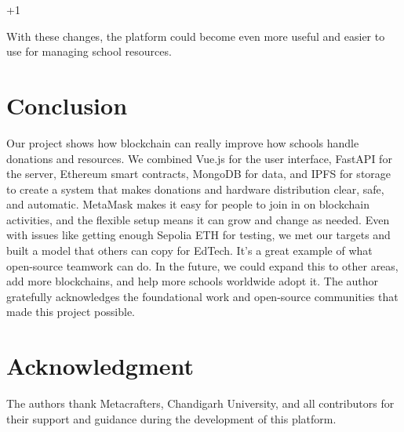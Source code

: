 +1\documentclass[conference]{IEEEtran}
\begin{document}
With these changes, the platform could become even more useful and easier to use for managing school resources.

\section{Conclusion}
Our project shows how blockchain can really improve how schools handle donations and resources. We combined Vue.js for the user interface, FastAPI for the server, Ethereum smart contracts, MongoDB for data, and IPFS for storage to create a system that makes donations and hardware distribution clear, safe, and automatic. MetaMask makes it easy for people to join in on blockchain activities, and the flexible setup means it can grow and change as needed. Even with issues like getting enough Sepolia ETH for testing, we met our targets and built a model that others can copy for EdTech. It's a great example of what open-source teamwork can do. In the future, we could expand this to other areas, add more blockchains, and help more schools worldwide adopt it. The author gratefully acknowledges the foundational work and open-source communities that made this project possible.

\section*{Acknowledgment}
The authors thank Metacrafters, Chandigarh University, and all contributors for their support and guidance during the development of this platform.
\end{document}
